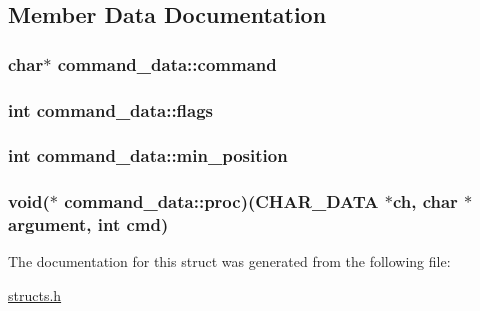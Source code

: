 \subsection{Member Data Documentation}
\hypertarget{structcommand__data_a7973dbece8d04ab7a146500721efde6f}{
\subsubsection[{command}]{\setlength{\rightskip}{0pt plus 5cm}char$\ast$ command\-\_\-data\-::command}}\label{structcommand__data_a7973dbece8d04ab7a146500721efde6f}
\hypertarget{structcommand__data_a3737745e9257a92a59402b56340ac250}{
\subsubsection[{flags}]{\setlength{\rightskip}{0pt plus 5cm}int command\-\_\-data\-::flags}}\label{structcommand__data_a3737745e9257a92a59402b56340ac250}
\hypertarget{structcommand__data_a90ec821dd6eb3eb1740ffd2dacc28fc8}{
\subsubsection[{min\-\_\-position}]{\setlength{\rightskip}{0pt plus 5cm}int command\-\_\-data\-::min\-\_\-position}}\label{structcommand__data_a90ec821dd6eb3eb1740ffd2dacc28fc8}
\hypertarget{structcommand__data_a39db54ac3e5c2e63cde48047b94adc07}{
\subsubsection[{proc}]{\setlength{\rightskip}{0pt plus 5cm}void($\ast$ command\-\_\-data\-::proc)({\bf C\-H\-A\-R\-\_\-\-D\-A\-T\-A} $\ast$ch, char $\ast$argument, int cmd)}}\label{structcommand__data_a39db54ac3e5c2e63cde48047b94adc07}


The documentation for this struct was generated from the following file\-:\begin{DoxyCompactItemize}
\item 
\hyperlink{structs_8h}{structs.\-h}\end{DoxyCompactItemize}
